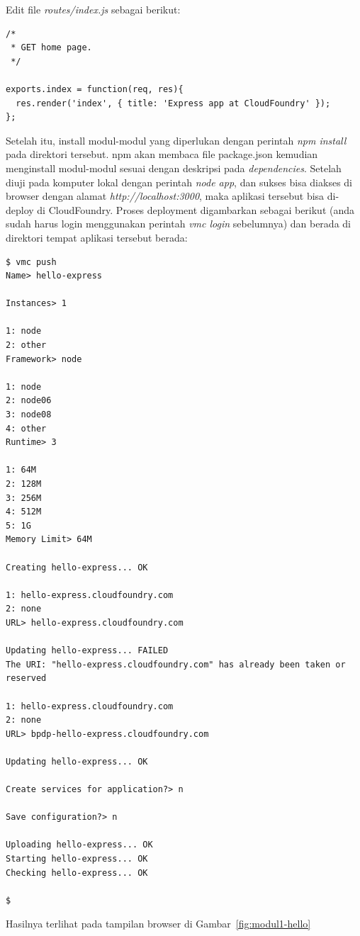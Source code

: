 Edit file \textit{routes/index.js} sebagai berikut:

\lstset{language=Javascript,caption=Hasil edit routes/index.js}
\begin{lstlisting}
/*
 * GET home page.
 */

exports.index = function(req, res){
  res.render('index', { title: 'Express app at CloudFoundry' });
};
\end{lstlisting}

Setelah itu, install modul-modul yang diperlukan dengan perintah \textit{npm install} pada direktori tersebut. npm akan membaca file package.json kemudian menginstall modul-modul sesuai dengan deskripsi pada \textit{dependencies}. Setelah diuji pada komputer lokal dengan perintah \textit{node app}, dan sukses bisa diakses di browser dengan alamat \textit{http://localhost:3000}, maka aplikasi tersebut bisa di-deploy di CloudFoundry. Proses deployment digambarkan sebagai berikut (anda sudah harus login menggunakan perintah \textit{vmc login} sebelumnya) dan berada di direktori tempat aplikasi tersebut berada:

\lstset{language=bash,caption=Deployment aplikasi ExpressJS ke CF}
\begin{lstlisting}
$ vmc push
Name> hello-express

Instances> 1

1: node
2: other
Framework> node

1: node
2: node06
3: node08
4: other
Runtime> 3

1: 64M
2: 128M
3: 256M
4: 512M
5: 1G
Memory Limit> 64M

Creating hello-express... OK

1: hello-express.cloudfoundry.com
2: none
URL> hello-express.cloudfoundry.com

Updating hello-express... FAILED
The URI: "hello-express.cloudfoundry.com" has already been taken or reserved

1: hello-express.cloudfoundry.com
2: none
URL> bpdp-hello-express.cloudfoundry.com

Updating hello-express... OK

Create services for application?> n

Save configuration?> n

Uploading hello-express... OK
Starting hello-express... OK
Checking hello-express... OK

$ 
\end{lstlisting}

Hasilnya terlihat pada tampilan browser di Gambar~\ref{fig:modul1-hello}

